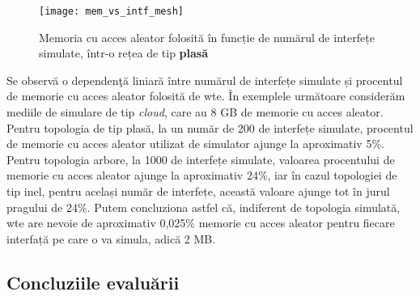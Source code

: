 \begin{figure}[hp]
	\centering
	\texttt{[image: mem\_vs\_intf\_mesh]}
	\caption{Memoria cu acces aleator folosită în funcție de numărul de interfețe simulate, într-o rețea de tip \textbf{plasă}}
	\label{fig:mem_vs_intf_mesh}
\end{figure}

Se observă o dependenţă liniară între numărul de interfețe simulate și procentul de memorie cu acces aleator folosită de \gls{wte}. În exemplele următoare considerăm mediile de simulare de tip \textit{cloud}, care au 8 GB de memorie cu acces aleator. Pentru topologia de tip plasă, la un număr de 200 de interfețe simulate, procentul de memorie cu acces aleator utilizat de simulator ajunge la aproximativ 5\%. Pentru topologia arbore, la 1000 de interfețe simulate, valoarea procentului de memorie cu acces aleator ajunge la aproximativ 24\%, iar în cazul topologiei de tip inel, pentru același număr de interfețe, această valoare ajunge tot în jurul pragului de 24\%. Putem concluziona astfel că, indiferent de topologia simulată, \gls{wte} are nevoie de aproximativ 0,025\% memorie cu acces aleator pentru fiecare interfață pe care o va simula, adică 2 MB.

\subsection{Concluziile evaluării}